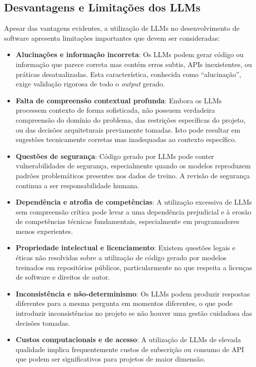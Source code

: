 \documentclass[a4paper,12pt]{scrreprt}
\begin{document}
\subsection{Desvantagens e Limitações dos LLMs}

Apesar das vantagens evidentes, a utilização de LLMs no desenvolvimento de software apresenta limitações importantes que devem ser consideradas:

\begin{itemize}
    \item \textbf{Alucinações e informação incorreta}: Os LLMs podem gerar código ou informação que parece correta mas contém erros subtis, APIs inexistentes, ou práticas desatualizadas. Esta característica, conhecida como ``alucinação'', exige validação rigorosa de todo o \textit{output} gerado.

    \item \textbf{Falta de compreensão contextual profunda}: Embora os LLMs processem contexto de forma sofisticada, não possuem verdadeira compreensão do domínio do problema, das restrições específicas do projeto, ou das decisões arquiteturais previamente tomadas. Isto pode resultar em sugestões tecnicamente corretas mas inadequadas ao contexto específico.

    \item \textbf{Questões de segurança}: Código gerado por LLMs pode conter vulnerabilidades de segurança, especialmente quando os modelos reproduzem padrões problemáticos presentes nos dados de treino. A revisão de segurança continua a ser responsabilidade humana.

    \item \textbf{Dependência e atrofia de competências}: A utilização excessiva de LLMs sem compreensão crítica pode levar a uma dependência prejudicial e à erosão de competências técnicas fundamentais, especialmente em programadores menos experientes.

    \item \textbf{Propriedade intelectual e licenciamento}: Existem questões legais e éticas não resolvidas sobre a utilização de código gerado por modelos treinados em repositórios públicos, particularmente no que respeita a licenças de software e direitos de autor.

    \item \textbf{Inconsistência e não-determinismo}: Os LLMs podem produzir respostas diferentes para a mesma pergunta em momentos diferentes, o que pode introduzir inconsistências no projeto se não houver uma gestão cuidadosa das decisões tomadas.

    \item \textbf{Custos computacionais e de acesso}: A utilização de LLMs de elevada qualidade implica frequentemente custos de subscrição ou consumo de API que podem ser significativos para projetos de maior dimensão.
\end{itemize}
\end{document}
